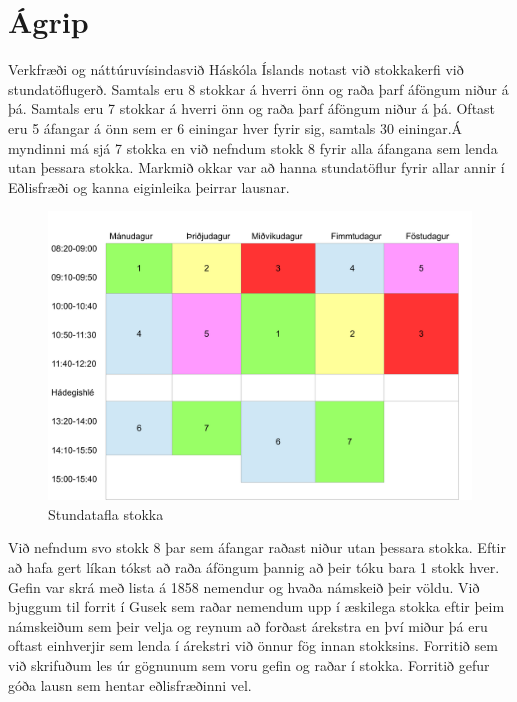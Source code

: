 \documentclass[a4paper,12pt]{article}
\begin{document}
\section{Ágrip}
Verkfræði og náttúruvísindasvið Háskóla Íslands notast við stokkakerfi við stundatöflugerð. Samtals eru 8 stokkar á hverri önn og raða þarf áföngum niður á þá. Samtals eru 7 stokkar á hverri önn og raða þarf áföngum niður á þá. Oftast eru 5 áfangar á önn sem er 6 einingar hver fyrir sig, samtals 30 einingar.Á myndinni má sjá 7 stokka en við nefndum stokk 8 fyrir alla áfangana sem lenda utan þessara stokka. Markmið okkar var að hanna stundatöflur fyrir allar annir í Eðlisfræði og kanna eiginleika þeirrar lausnar.
\begin{figure}[ht!]
\centering
\includegraphics[scale=0.3]{stundatafla}
\caption{Stundatafla stokka}
\label{fig: stundatafla}
\end{figure}

Við nefndum svo stokk 8 þar sem áfangar raðast niður utan þessara stokka. Eftir að hafa gert líkan tókst að raða áföngum þannig að þeir tóku bara 1 stokk hver. Gefin var skrá með lista á 1858 nemendur og hvaða námskeið þeir völdu. Við bjuggum til forrit í Gusek sem raðar nemendum upp í æskilega stokka eftir þeim námskeiðum sem þeir velja og reynum að forðast árekstra en því miður þá eru oftast einhverjir sem lenda í árekstri við önnur fög innan stokksins. Forritið sem við skrifuðum les úr gögnunum sem voru gefin og raðar í stokka. Forritið gefur góða lausn sem hentar eðlisfræðinni vel.
\end{document}
